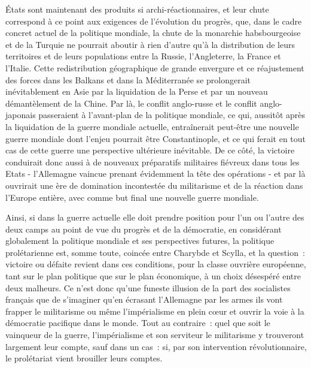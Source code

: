 \documentclass[french,twoside]{book} %
\begin{document}
États sont maintenant des produits si archi-réactionnaires, et leur chute correspond à ce point aux exigences de l’évolution du progrès, que, dans le cadre concret actuel de la politique mondiale, la chute de la monarchie habsbourgeoise et de la Turquie ne pourrait aboutir à rien d’autre qu’à la distribution de leurs territoires et de leurs populations entre la Russie, l’Angleterre, la France et l’Italie. Cette redistribution géographique de grande envergure et ce réajustement des forces dans les Balkans et dans la Méditerranée se prolongerait inévitablement en Asie par la liquidation de la Perse et par un nouveau démantèlement de la Chine. Par là, le conflit anglo-russe et le conflit anglo-japonais passeraient à l’avant-plan de la politique mondiale, ce qui, aussitôt après la liquidation de la guerre mondiale actuelle, entraînerait peut-être une nouvelle guerre mondiale dont l’enjeu pourrait être Constantinople, et ce qui ferait en tout cas de cette guerre une perspective ultérieure inévitable. De ce côté, la victoire conduirait donc aussi à de nouveaux préparatifs militaires fiévreux dans tous les Etats - l’Allemagne vaincue prenant évidemment la tête des opérations - et par là ouvrirait une ère  de domination incontestée du militarisme et de la réaction dans l’Europe entière, avec comme but final une nouvelle guerre mondiale.\par
Ainsi, si dans la guerre actuelle elle doit prendre position pour l’un ou l’autre des deux camps au point de vue du progrès et de la démocratie, en considérant globalement la politique mondiale et ses perspectives futures, la politique prolétarienne est, somme toute, coincée entre Charybde et Scylla, et la question : victoire ou défaite revient dans ces conditions, pour la classe ouvrière européenne, tant sur le plan politique que sur le plan économique, à un choix désespéré entre deux malheurs. Ce n’est donc qu’une funeste illusion de la part des socialistes français que de s’imaginer qu’en écrasant l’Allemagne par les armes ils vont frapper le militarisme ou même l’impérialisme en plein cœur et ouvrir la voie à la démocratie pacifique dans le monde. Tout au contraire : quel que soit le vainqueur de la guerre, l’impérialisme et son serviteur le militarisme y trouveront largement leur compte, sauf dans un cas : si, par son intervention révolutionnaire, le prolétariat vient brouiller leurs comptes.\par
\end{document}
